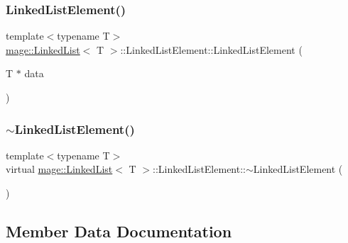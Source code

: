 \subsubsection{\texorpdfstring{Linked\+List\+Element()}{LinkedListElement()}}
{\footnotesize\ttfamily template$<$typename T$>$ \\
\hyperlink{classmage_1_1_linked_list}{mage\+::\+Linked\+List}$<$ T $>$\+::Linked\+List\+Element\+::\+Linked\+List\+Element (\begin{DoxyParamCaption}\item[{T $\ast$}]{data }\end{DoxyParamCaption})}

\hypertarget{structmage_1_1_linked_list_1_1_linked_list_element_a89ff38c90ddf8854abb821d1497e8e1c}{}\label{structmage_1_1_linked_list_1_1_linked_list_element_a89ff38c90ddf8854abb821d1497e8e1c} 
\subsubsection{\texorpdfstring{$\sim$\+Linked\+List\+Element()}{~LinkedListElement()}}
{\footnotesize\ttfamily template$<$typename T$>$ \\
virtual \hyperlink{classmage_1_1_linked_list}{mage\+::\+Linked\+List}$<$ T $>$\+::Linked\+List\+Element\+::$\sim$\+Linked\+List\+Element (\begin{DoxyParamCaption}{ }\end{DoxyParamCaption})\hspace{0.3cm}{\ttfamily [virtual]}}



\subsection{Member Data Documentation}
\hypertarget{structmage_1_1_linked_list_1_1_linked_list_element_a7db014fd56a2bffd6dab7f52f1b30687}{}\label{structmage_1_1_linked_list_1_1_linked_list_element_a7db014fd56a2bffd6dab7f52f1b30687} 
